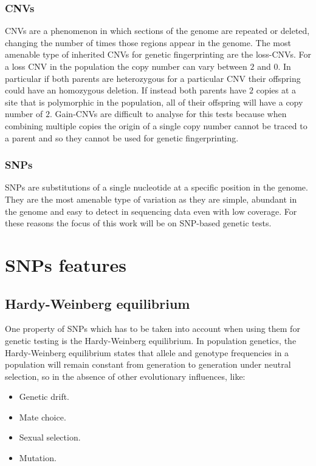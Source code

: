 		\subsubsection{CNVs}
		CNVs are a phenomenon in which sections of the genome are repeated or deleted, changing the number of times those regions appear in the genome.
		The most amenable type of inherited CNVs for genetic fingerprinting are the loss-CNVs.
		For a loss CNV in the population the copy number can vary between $2$ and $0$.
		In particular if both parents are heterozygous for a particular CNV their offspring could have an homozygous deletion.
		If instead both parents have $2$ copies at a site that is polymorphic in the population, all of their offspring will have a copy number of $2$.
		Gain-CNVs are difficult to analyse for this tests because when combining multiple copies the origin of a single copy number cannot be traced to a parent and so they cannot be used for genetic fingerprinting.

		\subsubsection{SNPs}
		SNPs are substitutions of a single nucleotide at a specific position in the genome.
		They are the most amenable type of variation as they are simple, abundant in the genome and easy to detect in sequencing data even with low coverage.
		For these reasons the focus of this work will be on SNP-based genetic tests.


\section{SNPs features}

	\subsection{Hardy-Weinberg equilibrium}
	One property of SNPs which has to be taken into account when using them for genetic testing is the Hardy-Weinberg equilibrium.
	In population genetics, the Hardy-Weinberg equilibrium states that allele and genotype frequencies in a population will remain constant from generation to generation under neutral selection, so in the absence of other evolutionary influences, like:

	\begin{multicols}{4}
		\begin{itemize}
			\item Genetic drift.
			\item Mate choice.
			\item Sexual selection.
			\item Mutation.
		\end{itemize}
	\end{multicols}

